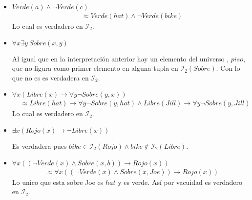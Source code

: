 \documentclass[8pt, letterpaper]{article}
\begin{document}
\begin{enumerate}
\begin{itemize}
\begin{itemize}
      \hfill\break
    \item $Verde(a) \land \neg Verde(c)$
      \begin{align*}
        &\approx Verde(hat) \land \neg Verde(bike)
      \end{align*}
      Lo cual es verdadero en $\mathcal{I}_2$.

      \hfill\break
    \item $\forall x \exists y\ Sobre(x,y)$

      \hfill\break
      Al igual que en la interpretación anterior hay un elemento del universo
      , $piso$, que no figura como primer elemento en alguna tupla en
      $\mathcal{I}_2(Sobre)$. Con lo que no es es verdadera en $\mathcal{I}_2$.

      \hfill\break
    \item $\forall x (Libre(x)\rightarrow \forall y \neg Sobre(y,x))$
      \begin{align*}
        &\approx Libre(hat)\rightarrow \forall y \neg Sobre(y,hat)
        \land Libre(Jill)\rightarrow \forall y \neg Sobre(y,Jill)
      \end{align*}
      Lo cual es verdadero en $\mathcal{I}_2$.

      \hfill\break
    \item $\exists x(Rojo(x) \rightarrow \neg Libre(x))$

      \hfill\break
      Es verdadera pues $bike\in \mathcal{I}_2(Rojo) \land bike\notin
      \mathcal{I}_2(Libre)$.

      \hfill\break
    \item $\forall x((\neg Verde(x) \land Sobre(x, b)) \rightarrow Rojo(x))$
      \begin{align*}
        &\approx \forall x((\neg Verde(x) \land Sobre(x, Joe)) \rightarrow
        Rojo(x))
      \end{align*}
      Lo unico que esta sobre Joe es $hat$ y es verde. Así por vacuidad
      es verdadero en $\mathcal{I}_2$.
    \end{itemize}
  \end{itemize}
\end{enumerate}
\end{document}

